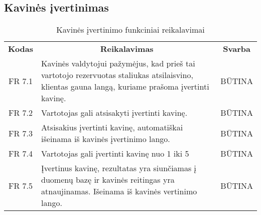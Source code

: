 \documentclass{VUMIFPSkursinis}
\begin{document}
\subsection{Kavinės įvertinimas}
\begin{center}
	\begin{table}[H]
	\begin{tabular}{|p{2cm}|p{}|p{}|}
	
	\hline
	    \rowcolor{lightgray}
		\multicolumn{3}{|c|}{Kavinės įvertinimas}\\
		
	\hline
		\multicolumn{1}{|c|}{{\bfseries Kodas}}&
		\multicolumn{1}{|c|}{{\bfseries Reikalavimas}}&
		\multicolumn{1}{|c|}{{\bfseries Svarba}}\\

	\hline
	
		\multicolumn{1}{|c|}{FR 7.1}&
		{Kavinės valdytojui pažymėjus, kad prieš tai vartotojo rezervuotas staliukas atsilaisvino, klientas gauna langą, kuriame prašoma įvertinti kavinę.}&
		\multicolumn{1}{|c|}{BŪTINA}\\				
	\hline
	
		\multicolumn{1}{|c|}{FR 7.2}&
		{Vartotojas gali atsisakyti įvertinti kavinę.}&
		\multicolumn{1}{|c|}{BŪTINA}\\				
	\hline
	
		\multicolumn{1}{|c|}{FR 7.3}&
		{Atsisakius įvertinti kavinę, automatiškai išeinama iš kavinės įvertinimo lango.}&
		\multicolumn{1}{|c|}{BŪTINA}\\				
	\hline
	
		\multicolumn{1}{|c|}{FR 7.4}&
		{Vartotojas gali įvertinti kavinę nuo 1 iki 5}&
		\multicolumn{1}{|c|}{BŪTINA}\\				
	\hline
	
		\multicolumn{1}{|c|}{FR 7.5}&
		{Įvertinus kavinę, rezultatas yra siunčiamas į duomenų bazę ir kavinės reitingas yra atnaujinamas. Išeinama iš kavinės vertinimo lango.}&
		\multicolumn{1}{|c|}{BŪTINA}\\				
	\hline	
	
	\end{tabular}		
	\caption{Kavinės įvertinimo funkciniai reikalavimai}
	\label{table:KavinėsĮvertinimas}
	\end{table}


\end{center}
\pagebreak
\end{document}
